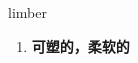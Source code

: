 
\begin{frame}
{\huge limber}
\begin{center}
\begin{enumerate}\Large
  \item \textbf{可塑的，柔软的}
\end{enumerate}
\end{center}
\end{frame}
